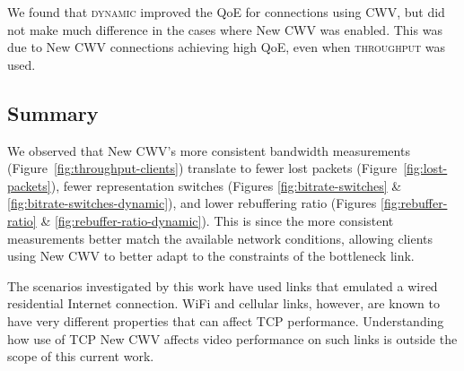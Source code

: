 \documentclass[10pt,sigconf]{acmart}
\begin{document}
We found that \textsc{dynamic} improved the QoE for connections using CWV, but did not make much difference in the cases where New CWV was enabled. This was due to New CWV connections achieving high QoE, even when \textsc{throughput} was used.

\subsection{Summary}
\label{sec:summary}


We observed that New CWV's more consistent bandwidth measurements (Figure~\ref{fig:throughput-clients}) translate to fewer lost packets (Figure~\ref{fig:lost-packets}), fewer representation switches (Figures \ref{fig:bitrate-switches} \& \ref{fig:bitrate-switches-dynamic}), and lower rebuffering ratio (Figures \ref{fig:rebuffer-ratio} \& \ref{fig:rebuffer-ratio-dynamic}).
This is since the more consistent measurements better match the available network conditions, allowing clients using New CWV to better adapt to the constraints of the bottleneck link. 

The scenarios investigated by this work have used links that emulated a wired
residential Internet connection.  WiFi and cellular links, however, are known
to have very different properties that can affect TCP performance. Understanding
how use of TCP New CWV affects video performance on such links is outside the
scope of this current work.
\end{document}
